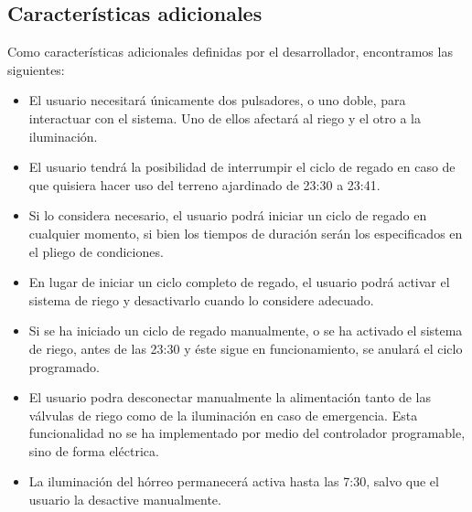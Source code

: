 \subsection{Caracter\'isticas adicionales}

Como caracter\'isticas adicionales definidas por el desarrollador, encontramos las siguientes:

\begin{itemize}
 \item El usuario necesitar\'a \'unicamente dos pulsadores, o uno doble, para interactuar con el sistema. Uno de ellos afectar\'a al riego y el otro a la iluminaci\'on.
 \item El usuario tendr\'a la posibilidad de interrumpir el ciclo de regado en caso de que quisiera hacer uso del terreno ajardinado de 23:30 a 23:41.
 \item Si lo considera necesario, el usuario podr\'a iniciar un ciclo de regado en cualquier momento, si bien los tiempos de duraci\'on ser\'an los especificados en el pliego de condiciones.
 \item En lugar de iniciar un ciclo completo de regado, el usuario podr\'a activar el sistema de riego y desactivarlo cuando lo considere adecuado.
 \item Si se ha iniciado un ciclo de regado manualmente, o se ha activado el sistema de riego, antes de las 23:30 y \'este sigue en funcionamiento, se anular\'a el ciclo programado.
 \item El usuario podra desconectar manualmente la alimentaci\'on tanto de las v\'alvulas de riego como de la iluminaci\'on en caso de emergencia. Esta funcionalidad no se ha implementado por medio del controlador programable, sino de forma el\'ectrica.
 \item La iluminaci\'on del h\'orreo permanecer\'a activa hasta las 7:30, salvo que el usuario la desactive manualmente.
\end{itemize}